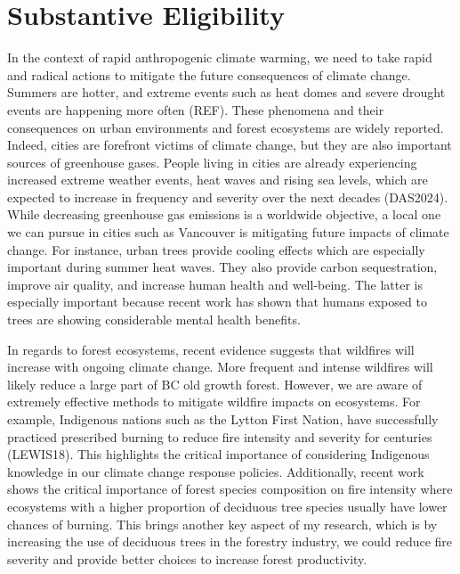 \documentclass[11pt,letter]{article}
\begin{document}
\section *{Substantive Eligibility} 
In the context of rapid anthropogenic climate warming, we need to take rapid and radical actions to mitigate the future consequences of climate change. Summers are hotter, and extreme events such as heat domes and severe drought events are happening more often (REF). These phenomena and their consequences on urban environments and forest ecosystems are widely reported. Indeed, cities are forefront victims of climate change, but they are also important sources of greenhouse gases. People living in cities are already experiencing increased extreme weather events, heat waves and rising sea levels, which are expected to increase in frequency and severity over the next decades (DAS2024). While decreasing greenhouse gas emissions is a worldwide objective, a local one we can pursue in cities such as Vancouver is mitigating future impacts of climate change. For instance, urban trees provide cooling effects which are especially important during summer heat waves. They also provide carbon sequestration, improve air quality, and increase human health and well-being. The latter is especially important because recent work has shown that humans exposed to trees are showing considerable mental health benefits. 
\par
In regards to forest ecosystems, recent evidence suggests that wildfires will increase with ongoing climate change. More frequent and intense wildfires will likely reduce a large part of BC old growth forest. However, we are aware of extremely effective methods to mitigate wildfire impacts on ecosystems. For example, Indigenous nations such as the Lytton First Nation, have successfully practiced prescribed burning to reduce fire intensity and severity for centuries (LEWIS18). This highlights the critical importance of considering Indigenous knowledge in our climate change response policies. Additionally, recent work shows the critical importance of forest species composition on fire intensity where ecosystems with a higher proportion of deciduous tree species usually have lower chances of burning. This brings another key aspect of my research, which is by increasing the use of deciduous trees in the forestry industry, we could reduce fire severity and provide better choices to increase forest productivity. %


\end{document}
